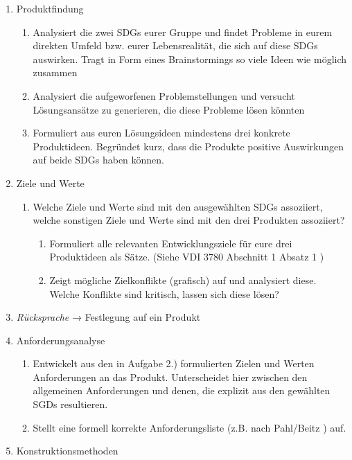 \documentclass[DIV=15,headinclude=true]{scrreprt}
\begin{document}
\begin{enumerate}
	\def\labelenumi{\arabic{enumi}.}
	\item
	      Produktfindung

	      \begin{enumerate}
		      \item
		            Analysiert die zwei SDGs eurer Gruppe und findet Probleme in eurem
		            direkten Umfeld bzw. eurer Lebensrealität, die sich auf diese SDGs
		            auswirken. Tragt in Form eines Brainstormings so viele Ideen wie
		            möglich zusammen
		      \item
		            Analysiert die aufgeworfenen Problemstellungen und versucht
		            Lösungsansätze zu generieren, die diese Probleme lösen könnten
		      \item
		            Formuliert aus euren Lösungsideen mindestens drei konkrete
		            Produktideen. Begründet kurz, dass die Produkte positive
		            Auswirkungen auf beide SDGs haben können.
	      \end{enumerate}
	\item
	      Ziele und Werte

	      \begin{enumerate}
		      \item
		            Welche Ziele und Werte sind mit den ausgewählten SDGs assoziiert,
		            welche sonstigen Ziele und Werte sind mit den drei Produkten
		            assoziiert?

		            \begin{enumerate}
			            \item
			                  Formuliert alle relevanten Entwicklungsziele für eure drei
			                  Produktideen als Sätze. (Siehe VDI 3780 Abschnitt 1 Absatz 1 \cite[S. 4]{VDI2000})
			            \item
			                  Zeigt mögliche Zielkonflikte (grafisch) auf und analysiert diese.
			                  Welche Konflikte sind kritisch, lassen sich diese lösen?
		            \end{enumerate}
	      \end{enumerate}
	\item
	      \emph{Rücksprache} → Festlegung auf ein Produkt
	\item
	      Anforderungsanalyse

	      \begin{enumerate}
		      \item
		            Entwickelt aus den in Aufgabe 2.) formulierten Zielen und Werten
		            Anforderungen an das Produkt. Unterscheidet hier zwischen den
		            allgemeinen Anforderungen und denen, die explizit aus den gewählten
		            SGDs resultieren.
		      \item
		            Stellt eine formell korrekte Anforderungsliste (z.B. nach
		            Pahl/Beitz \cite[S. 271]{Bender2021}) auf.
	      \end{enumerate}
	\item
	      Konstruktionsmethoden


\end{enumerate}
\end{document}

